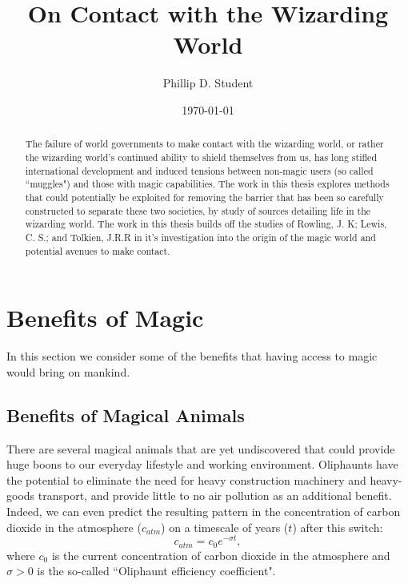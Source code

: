 \documentclass[]{article}
\title{On Contact with the Wizarding World}
\author{Phillip D. Student}
\date{\today}
\begin{document}
 
\maketitle %
 
\begin{abstract}
The failure of world governments to make contact with the wizarding world, or rather the wizarding world's continued ability to shield themselves from us, has long stifled international development and induced tensions between non-magic users (so called ``muggles") and those with magic capabilities.
The work in this thesis explores methods that could potentially be exploited for removing the barrier that has been so carefully constructed to separate these two societies, by study of sources detailing life in the wizarding world.
The work in this thesis builds off the studies of Rowling, J. K; Lewis, C. S.; and Tolkien, J.R.R in it's investigation into the origin of the magic world and potential avenues to make contact.
\end{abstract}

\section{Benefits of Magic} \label{sec:BenefitsOfMagic}
In this section we consider some of the benefits that having access to magic would bring on mankind.

\subsection{Benefits of Magical Animals} \label{sec:Animals}
There are several magical animals that are yet undiscovered that could provide huge boons to our everyday lifestyle and working environment.
Oliphaunts have the potential to eliminate the need for heavy construction machinery and heavy-goods transport, and provide little to no air pollution as an additional benefit.
Indeed, we can even predict the resulting pattern in the concentration of carbon dioxide in the atmosphere ($c_{atm}$) on a timescale of years ($t$) after this switch:
\begin{equation} \label{eq:CO2Reduction}
    c_{atm} = c_{0} e^{-\sigma t},
\end{equation}
where $c_{0}$ is the current concentration of carbon dioxide in the atmosphere and $\sigma>0$ is the so-called ``Oliphaunt efficiency coefficient". \newline
\end{document}
